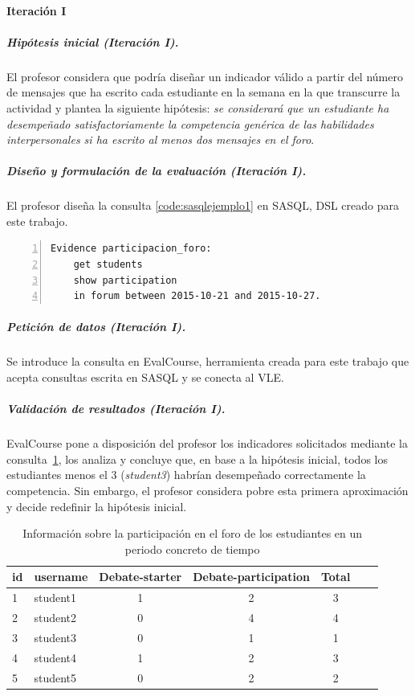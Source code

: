 \paragraph*{Iteración I}

\subparagraph*{Hipótesis inicial (Iteración I).}

El profesor considera que podría diseñar un indicador válido a partir del número de mensajes que ha escrito cada estudiante en la semana en la que transcurre la actividad y plantea la siguiente hipótesis: \emph{se considerará que un estudiante ha desempeñado satisfactoriamente la competencia genérica de las habilidades interpersonales si ha escrito al menos dos mensajes en el foro}.

\subparagraph*{Diseño y formulación de la evaluación (Iteración I).}

El profesor diseña la consulta \ref{code:sasqlejemplo1} en SASQL, DSL creado para este trabajo.

\begin{lstlisting}[caption=Participación en el foro en un periodo concreto de tiempo ,label=code:sasqlejemplo1,numbers=left, captionpos=b, morekeywords={Evidence,get, students, show, milestones, participation, access, in, assignment, forum, campus, workshop, interaction, between, and}]
Evidence participacion_foro: 
	get students
	show participation
	in forum between 2015-10-21 and 2015-10-27.
\end{lstlisting}

\subparagraph*{Petición de datos (Iteración I).}

Se introduce la consulta en EvalCourse, herramienta creada para este trabajo que acepta consultas escrita en SASQL y se conecta al VLE.

\subparagraph*{Validación de resultados (Iteración I).}

EvalCourse pone a disposición del profesor los indicadores solicitados mediante la consulta~\ref{tab:EvalCourseEj1}, los analiza y concluye que, en base a la hipótesis inicial, todos los estudiantes menos el 3 (\emph{student3}) habrían desempeñado correctamente la competencia. Sin embargo, el profesor considera pobre esta primera aproximación y decide redefinir la hipótesis inicial.

\begin{table}
	\centering
	\caption{Información sobre la participación en el foro de los estudiantes en un periodo concreto de tiempo}
	\label{tab:EvalCourseEj1}
	\begin{tabular}{|l|l|c|c|c|c|c|}
		\hline
		id & username & Debate-starter & Debate-participation & Total \\
		\hline
		\hline
		1 & student1 & 1 & 2 & 3  \\
		\hline
		2 & student2 & 0 & 4 & 4  \\
		\hline
		3 & student3 & 0 & 1 & 1  \\
		\hline
		4 & student4 & 1 & 2 & 3  \\
		\hline
		5 & student5 & 0 & 2 & 2  \\
		\hline
	\end{tabular}
\end{table}


